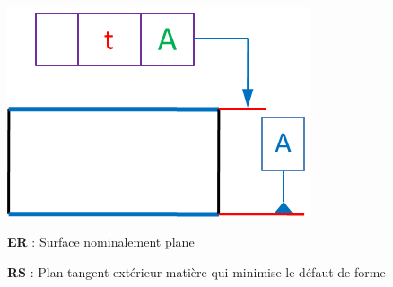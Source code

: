 \documentclass[11pt,oneside]{article}
\begin{document}
\begin{exemple}
\begin{minipage}[t]{.3\linewidth}
$\;$

\begin{center}
\includegraphics[width=.95\textwidth]{png/rs_plan}
\end{center}
\end{minipage} \hfill
\begin{minipage}[t]{.3\linewidth}
\textbf{ER} : Surface nominalement plane

\textbf{RS} : Plan tangent extérieur matière qui minimise le défaut de forme
\end{minipage} \hfill
\begin{minipage}[t]{.3\linewidth}
\begin{center}
\end{center}
\end{minipage} 
\end{exemple}
\end{document}

